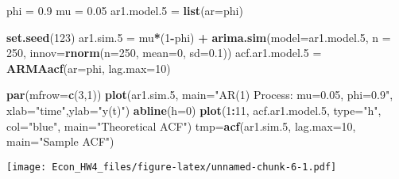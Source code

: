 \documentclass[]{article}
\newenvironment{Shaded}{\begin{snugshade}}{\end{snugshade}}
\newcommand{\KeywordTok}[1]{\textcolor[rgb]{0.13,0.29,0.53}{\textbf{#1}}}
\newcommand{\DataTypeTok}[1]{\textcolor[rgb]{0.13,0.29,0.53}{#1}}
\newcommand{\DecValTok}[1]{\textcolor[rgb]{0.00,0.00,0.81}{#1}}
\newcommand{\FloatTok}[1]{\textcolor[rgb]{0.00,0.00,0.81}{#1}}
\newcommand{\StringTok}[1]{\textcolor[rgb]{0.31,0.60,0.02}{#1}}
\newcommand{\OperatorTok}[1]{\textcolor[rgb]{0.81,0.36,0.00}{\textbf{#1}}}
\newcommand{\NormalTok}[1]{#1}
\begin{document}
\begin{Shaded}
\begin{Highlighting}[]
\NormalTok{phi =}\StringTok{ }\FloatTok{0.9}
\NormalTok{mu  =}\StringTok{ }\FloatTok{0.05}
\NormalTok{ar1.model.}\DecValTok{5}\NormalTok{ =}\StringTok{ }\KeywordTok{list}\NormalTok{(}\DataTypeTok{ar=}\NormalTok{phi)}

\KeywordTok{set.seed}\NormalTok{(}\DecValTok{123}\NormalTok{)}
\NormalTok{ar1.sim.}\DecValTok{5}\NormalTok{ =}\StringTok{ }\NormalTok{mu}\OperatorTok{*}\NormalTok{(}\DecValTok{1}\OperatorTok{-}\NormalTok{phi) }\OperatorTok{+}\StringTok{ }\KeywordTok{arima.sim}\NormalTok{(}\DataTypeTok{model=}\NormalTok{ar1.model.}\DecValTok{5}\NormalTok{, }\DataTypeTok{n =} \DecValTok{250}\NormalTok{,}
                             \DataTypeTok{innov=}\KeywordTok{rnorm}\NormalTok{(}\DataTypeTok{n=}\DecValTok{250}\NormalTok{, }\DataTypeTok{mean=}\DecValTok{0}\NormalTok{, }\DataTypeTok{sd=}\FloatTok{0.1}\NormalTok{))}
\NormalTok{acf.ar1.model.}\DecValTok{5}\NormalTok{ =}\StringTok{ }\KeywordTok{ARMAacf}\NormalTok{(}\DataTypeTok{ar=}\NormalTok{phi, }\DataTypeTok{lag.max=}\DecValTok{10}\NormalTok{)}

\KeywordTok{par}\NormalTok{(}\DataTypeTok{mfrow=}\KeywordTok{c}\NormalTok{(}\DecValTok{3}\NormalTok{,}\DecValTok{1}\NormalTok{))}
    \KeywordTok{plot}\NormalTok{(ar1.sim.}\DecValTok{5}\NormalTok{, }\DataTypeTok{main=}\StringTok{"AR(1) Process: mu=0.05, phi=0.9"}\NormalTok{,}
           \DataTypeTok{xlab=}\StringTok{"time"}\NormalTok{,}\DataTypeTok{ylab=}\StringTok{"y(t)"}\NormalTok{)}
    \KeywordTok{abline}\NormalTok{(}\DataTypeTok{h=}\DecValTok{0}\NormalTok{)}
    \KeywordTok{plot}\NormalTok{(}\DecValTok{1}\OperatorTok{:}\DecValTok{11}\NormalTok{, acf.ar1.model.}\DecValTok{5}\NormalTok{, }\DataTypeTok{type=}\StringTok{"h"}\NormalTok{, }\DataTypeTok{col=}\StringTok{"blue"}\NormalTok{, }\DataTypeTok{main=}\StringTok{"Theoretical ACF"}\NormalTok{)}
\NormalTok{    tmp=}\KeywordTok{acf}\NormalTok{(ar1.sim.}\DecValTok{5}\NormalTok{, }\DataTypeTok{lag.max=}\DecValTok{10}\NormalTok{, }\DataTypeTok{main=}\StringTok{"Sample ACF"}\NormalTok{)}
\end{Highlighting}
\end{Shaded}

\texttt{[image: Econ\_HW4\_files/figure-latex/unnamed-chunk-6-1.pdf]}
\end{document}
